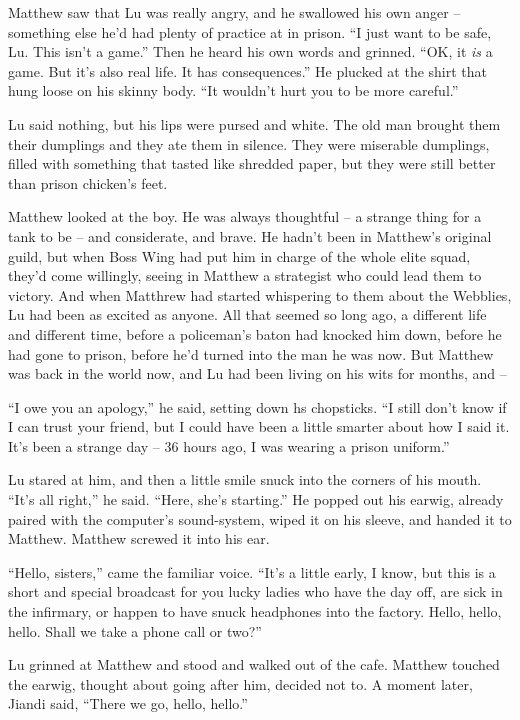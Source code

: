 Matthew saw that Lu was really angry, and he swallowed his own
anger -- something else he'd had plenty of practice at in prison.
``I just want to be safe, Lu. This isn't a game.'' Then he heard his
own words and grinned. ``OK, it \emph{is} a game. But it's also real
life. It has consequences.'' He plucked at the shirt that hung loose
on his skinny body. ``It wouldn't hurt you to be more careful.''

Lu said nothing, but his lips were pursed and white. The old man
brought them their dumplings and they ate them in silence. They
were miserable dumplings, filled with something that tasted like
shredded paper, but they were still better than prison chicken's
feet.

Matthew looked at the boy. He was always thoughtful -- a strange
thing for a tank to be -- and considerate, and brave. He hadn't
been in Matthew's original guild, but when Boss Wing had put him in
charge of the whole elite squad, they'd come willingly, seeing in
Matthew a strategist who could lead them to victory. And when
Matthrew had started whispering to them about the Webblies, Lu had
been as excited as anyone. All that seemed so long ago, a different
life and different time, before a policeman's baton had knocked him
down, before he had gone to prison, before he'd turned into the man
he was now. But Matthew was back in the world now, and Lu had been
living on his wits for months, and --

``I owe you an apology,'' he said, setting down hs chopsticks. ``I
still don't know if I can trust your friend, but I could have been
a little smarter about how I said it. It's been a strange day -- 36
hours ago, I was wearing a prison uniform.''

Lu stared at him, and then a little smile snuck into the corners of
his mouth. ``It's all right,'' he said. ``Here, she's starting.'' He
popped out his earwig, already paired with the computer's
sound-system, wiped it on his sleeve, and handed it to Matthew.
Matthew screwed it into his ear.

``Hello, sisters,'' came the familiar voice. ``It's a little early, I
know, but this is a short and special broadcast for you lucky
ladies who have the day off, are sick in the infirmary, or happen
to have snuck headphones into the factory. Hello, hello, hello.
Shall we take a phone call or two?''

Lu grinned at Matthew and stood and walked out of the cafe. Matthew
touched the earwig, thought about going after him, decided not to.
A moment later, Jiandi said, ``There we go, hello, hello.''


